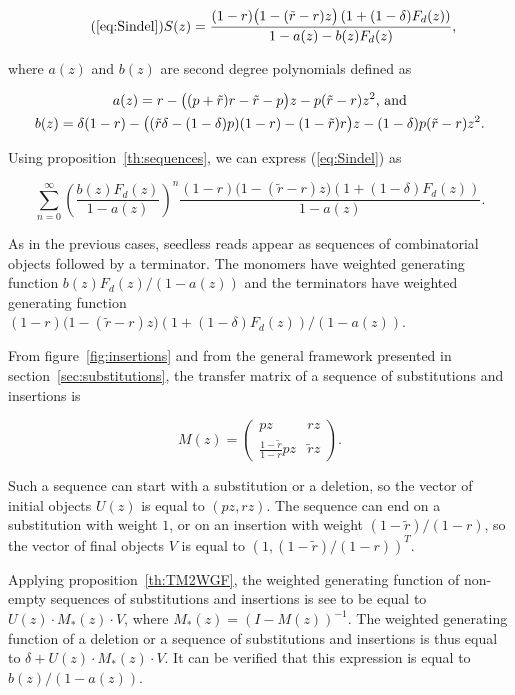 \documentclass{article}
\begin{document}
\begin{equation}
\tag{\ref{eq:Sindel}}
S(z) = \frac{(1-r)\big( 1-(\tilde{r}-r)z \big) \left(1+(1-\delta)F_d(z)
\right)}{1-a(z)-b(z)F_d(z)},
\end{equation}

\noindent
where $a(z)$ and $b(z)$ are second degree polynomials defined as

\begin{gather*}
a(z) = r-\big((p+\tilde{r})r-\tilde{r}-p\big)z
- p(\tilde{r}-r)z^2\text{, and} \\
b(z) = \delta(1-r) - \big((\tilde{r}\delta-(1-\delta)p)(1-r)
-(1-\tilde{r})r\big)z -(1-\delta)p(\tilde{r}-r)z^2.
\notag
\end{gather*}


Using proposition~\ref{th:sequences}, we can express (\ref{eq:Sindel}) as

\begin{equation*}
  \sum_{n=0}^\infty \left( \frac{b(z)F_d(z)}{1-a(z)}
  \right)^n \frac{(1-r)\big( 1-(\tilde{r}-r)z \big)
\left(1+(1-\delta)F_d(z)\right)}{1-a(z)}.
\end{equation*}

As in the previous cases, seedless reads appear as sequences of
combinatorial objects followed by a terminator. The monomers have
weighted generating function $b(z)F_d(z)/(1-a(z))$ and the terminators
have weighted generating function $(1-r)\big( 1-(\tilde{r}-r)z
\big)\left(1+(1-\delta)F_d(z)\right)/(1-a(z))$.

From figure~\ref{fig:insertions} and from the general framework presented
in section~\ref{sec:substitutions}, the transfer matrix of 
a sequence of substitutions and insertions is

\begin{equation*}
M(z) = \left(
\begin{matrix}
pz      & rz  \\
\frac{1-\tilde{r}}{1-r}pz & \tilde{r}z
\end{matrix}
\right).
\end{equation*}

Such a sequence can start with a substitution or a deletion, so the vector
of initial objects $U(z)$ is equal to $(pz, rz)$. The sequence can end on
a substitution with weight $1$, or on an insertion with weight
$(1-\tilde{r})/(1-r)$, so the vector of final objects $V$ is equal to $(1,
(1-\tilde{r})/(1-r))^T$.

Applying proposition~\ref{th:TM2WGF}, the weighted generating function of
non-empty sequences of substitutions and insertions is see to be equal to
$U(z) \cdot M_*(z) \cdot V$, where $M_*(z) = (I-M(z))^{-1}$. The weighted
generating function of a deletion or a sequence of substitutions and
insertions is thus equal to $\delta + U(z) \cdot M_*(z) \cdot V$. It can
be verified that this expression is equal to $b(z)/(1-a(z))$.
\end{document}
